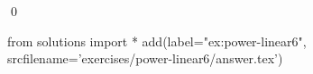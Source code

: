 
\begin{ex} 
  \label{ex:power-linear6}
  
  \qed
\end{ex} 
\begin{python0}
from solutions import *
add(label="ex:power-linear6",
    srcfilename='exercises/power-linear6/answer.tex') 
\end{python0}
